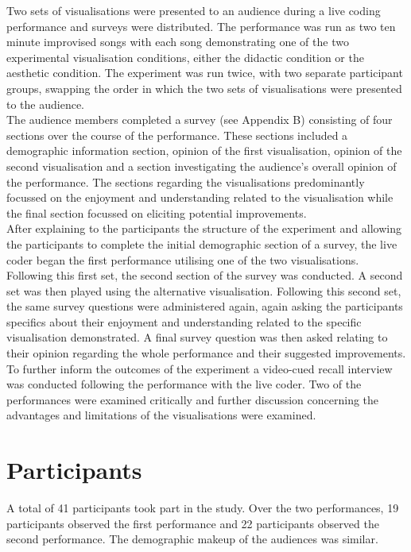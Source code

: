 Two sets of visualisations were presented to an audience during a live coding performance and surveys were distributed. The performance was run as two ten minute improvised songs with each song demonstrating one of the two experimental visualisation conditions, either the didactic condition or the aesthetic condition. The experiment was run twice, with two separate participant groups, swapping the order in which the two sets of visualisations were presented to the audience.\\

The audience members completed a survey (see Appendix B) consisting of four sections over the course of the performance. These sections included a demographic information section, opinion of the first visualisation, opinion of the second visualisation and a section investigating the audience's overall opinion of the performance. The sections regarding the visualisations predominantly focussed on the enjoyment and understanding related to the visualisation while the final section focussed on eliciting potential improvements.\\

After explaining to the participants the structure of the experiment and allowing the participants to complete the initial demographic section of a survey, the live coder began the first performance utilising one of the two visualisations. Following this first set, the second section of the survey was conducted. A second set was then played using the alternative visualisation. Following this second set, the same survey questions were administered again, again asking the participants specifics about their enjoyment and understanding related to the specific visualisation demonstrated. A final survey question was then asked relating to their opinion regarding the whole performance and their suggested improvements.\\

To further inform the outcomes of the experiment a video-cued recall interview was conducted following the performance with the live coder. Two of the performances were examined critically and further discussion concerning the advantages and limitations of the visualisations were examined.

\section{Participants}

A total of 41 participants took part in the study. Over the two performances, 19 participants observed the first performance and 22 participants observed the second performance. The demographic makeup of the audiences was similar.\\

